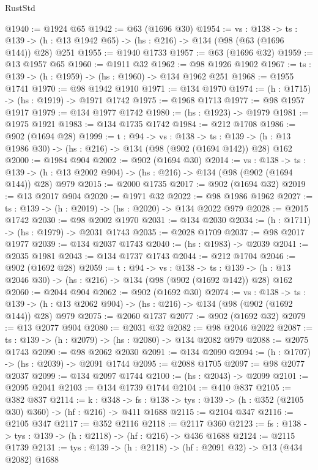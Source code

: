 \begin{lexlean}{RustStd}
\begin{coremodule}
{\begin{coremodule}
{{{{{{{{{@1940 := @1924 @65
@1942 := @63 (@1696 @30)
@1954 := {vs : @138} ->
  {ts : @139} -> (h : @13 @1942 @65) -> (hs : @216) -> @134 (@98 (@63 (@1696 @144)) @28) @251
@1955 := @1940 @1733
@1957 := @63 (@1696 @32)
@1959 := @13 @1957 @65
@1960 := @1911 @32
@1962 := @98 @1926 @1902
@1967 := {ts : @139} -> (h : @1959) -> (hs : @1960) -> @134 @1962 @251
@1968 := @1955 @1741
@1970 := @98 @1942 @1910
@1971 := @134 @1970
@1974 := (h : @1715) -> (hs : @1919) -> @1971 @1742
@1975 := @1968 @1713
@1977 := @98 @1957 @1917
@1979 := @134 @1977 @1742
@1980 := (hs : @1923) -> @1979
@1981 := @1975 @1921
@1983 := @134 @1735 @1742
@1984 := @212 @1708
@1986 := @902 (@1694 @28)
@1999 := {t : @94} ->
  {vs : @138} ->
  {ts : @139} -> (h : @13 @1986 @30) -> (hs : @216) -> @134 (@98 (@902 (@1694 @142)) @28) @162
@2000 := @1984 @904
@2002 := @902 (@1694 @30)
@2014 := {vs : @138} ->
  {ts : @139} -> (h : @13 @2002 @904) -> (hs : @216) -> @134 (@98 (@902 (@1694 @144)) @28) @979
@2015 := @2000 @1735
@2017 := @902 (@1694 @32)
@2019 := @13 @2017 @904
@2020 := @1971 @32
@2022 := @98 @1986 @1962
@2027 := {ts : @139} -> (h : @2019) -> (hs : @2020) -> @134 @2022 @979
@2028 := @2015 @1742
@2030 := @98 @2002 @1970
@2031 := @134 @2030
@2034 := (h : @1711) -> (hs : @1979) -> @2031 @1743
@2035 := @2028 @1709
@2037 := @98 @2017 @1977
@2039 := @134 @2037 @1743
@2040 := (hs : @1983) -> @2039
@2041 := @2035 @1981
@2043 := @134 @1737 @1743
@2044 := @212 @1704
@2046 := @902 (@1692 @28)
@2059 := {t : @94} ->
  {vs : @138} ->
  {ts : @139} -> (h : @13 @2046 @30) -> (hs : @216) -> @134 (@98 (@902 (@1692 @142)) @28) @162
@2060 := @2044 @904
@2062 := @902 (@1692 @30)
@2074 := {vs : @138} ->
  {ts : @139} -> (h : @13 @2062 @904) -> (hs : @216) -> @134 (@98 (@902 (@1692 @144)) @28) @979
@2075 := @2060 @1737
@2077 := @902 (@1692 @32)
@2079 := @13 @2077 @904
@2080 := @2031 @32
@2082 := @98 @2046 @2022
@2087 := {ts : @139} -> (h : @2079) -> (hs : @2080) -> @134 @2082 @979
@2088 := @2075 @1743
@2090 := @98 @2062 @2030
@2091 := @134 @2090
@2094 := (h : @1707) -> (hs : @2039) -> @2091 @1744
@2095 := @2088 @1705
@2097 := @98 @2077 @2037
@2099 := @134 @2097 @1744
@2100 := (hs : @2043) -> @2099
@2101 := @2095 @2041
@2103 := @134 @1739 @1744
@2104 := @410 @837
@2105 := @382 @837
@2114 := {k : @348} ->
  {fs : @138} -> {tys : @139} -> (h : @352 (@2105 @30) @360) -> (hf : @216) -> @411 @1688
@2115 := @2104 @347
@2116 := @2105 @347
@2117 := @352 @2116
@2118 := @2117 @360
@2123 := {fs : @138} -> {tys : @139} -> (h : @2118) -> (hf : @216) -> @436 @1688
@2124 := @2115 @1739
@2131 := {tys : @139} -> (h : @2118) -> (hf : @2091 @32) -> @13 (@434 @2082) @1688
}}}}}}}}}
\end{coremodule}}
\end{coremodule}
\end{lexlean}
